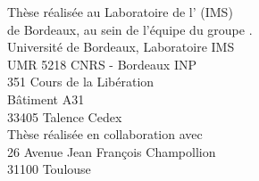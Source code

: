\thispagestyle{empty}

\vspace*{\fill}

\begin{center}
Thèse réalisée au Laboratoire de l' (IMS)\\
de Bordeaux, au sein de l'équipe  du groupe .\\
\vspace*{1em}
Université de Bordeaux, Laboratoire IMS\\
UMR 5218 CNRS - Bordeaux INP\\
351 Cours de la Libération\\
Bâtiment A31\\
33405 Talence Cedex\\

\vspace*{2em}
Thèse réalisée en collaboration avec \\
\vspace*{1em}
26 Avenue Jean François  Champollion\\
31100 Toulouse




\end{center}